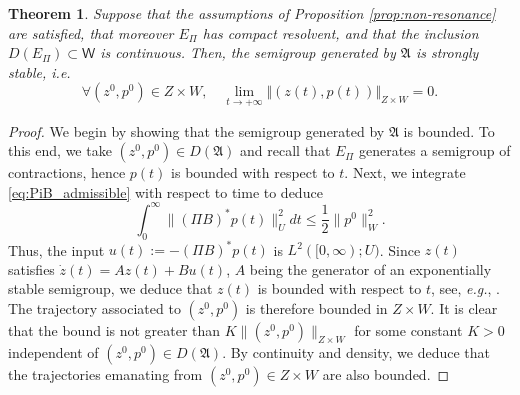\documentclass[10pt]{article}
\newtheorem{Theorem}{Theorem}[section]
\begin{document}
\begin{Theorem}\label{theo_strong_stbl}
Suppose that the assumptions of Proposition \ref{prop:non-resonance} are satisfied, that moreover $E_\Pi$ has compact resolvent, and that the inclusion $D(E_\Pi) \subset \mathsf{W}$ is continuous. Then, the semigroup generated by $\mathfrak{A}$ is strongly stable, \textit{i.e.}
\begin{equation}\label{eq:strong_stabl}
\forall (z^0,p^0) \in Z \times W,\quad \lim_{t\rightarrow + \infty} \Vert (z(t),p(t))\Vert_{Z\times W} = 0.
\end{equation}
\end{Theorem}

\begin{proof}
We begin by showing that the semigroup generated by $\mathfrak{A}$ is bounded. To this end, we take $(z^0,p^0) \in D(\mathfrak{A})$ and recall that $E_\Pi$ generates a semigroup of contractions, hence $p(t)$ is bounded with respect to $t$. Next, we integrate \eqref{eq:PiB_admissible} with respect to time to deduce 
\begin{equation}\label{eq:controle_obs}
    \int_0^\infty \| (\Pi B)^*p(t)\|_U^2 dt \leq \frac{1}{2} \|p^0\|_W^2.
\end{equation}
Thus, the input $u(t) := - (\Pi B)^*p(t)$ is $L^2([0,\infty);U)$. Since $z(t)$ satisfies $\dot{z}(t) = Az(t) + Bu(t)$, $A$ being  the generator of an exponentially stable semigroup, we deduce that $z(t)$ is bounded with respect to $t$, see, \textit{e.g.}, \cite[Proposition 4.4.5]{tucsnak2009observation}. The trajectory associated to $(z^0,p^0)$ is therefore bounded in $Z \times W$. It is clear that the bound is not greater than $K \|(z^0,p^0)\|_{Z \times W}$ for some constant $K > 0$ independent of $(z^0,p^0) \in D(\mathfrak{A})$. By continuity and density, we deduce that the trajectories emanating from $(z^0,p^0) \in Z \times W$ are also bounded.


\end{proof}
\end{document}
